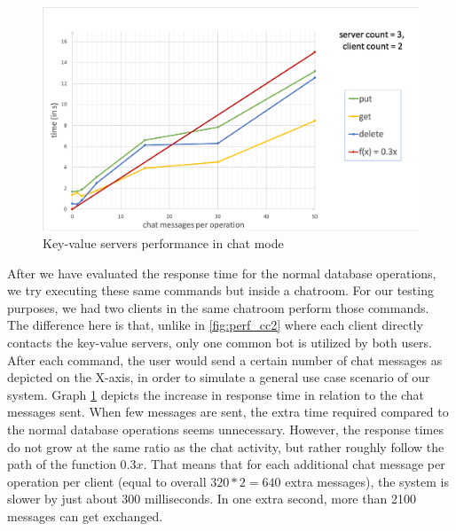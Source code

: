 \begin{figure}[h]
	\centering
	\includegraphics[width=0.8\linewidth]{figures/chat(linear).png}
	\caption{Key-value servers performance in chat mode}
	\label{fig:perf_chat_lin}
\end{figure}

After we have evaluated the response time for the normal database operations, we try executing these same commands but inside a chatroom. For our testing purposes, we had two clients in the same chatroom perform those commands. The difference here is that, unlike in \ref{fig:perf_cc2} where each client directly contacts the key-value servers, only one common bot is utilized by both users. After each command, the user would send a certain number of chat messages as depicted on the X-axis, in order to simulate a general use case scenario of our system. Graph \ref{fig:perf_chat_lin} depicts the increase in response time in relation to the chat messages sent.
When few messages are sent, the extra time required compared to the normal database operations seems unnecessary. 
However, the response times do not grow at the same ratio as the chat activity, but rather roughly follow the path of the function \begin{math}0.3x\end{math}. That means that for each additional chat message per operation per client (equal to overall \begin{math}320 * 2 = 640\end{math} extra messages), the system is slower by just about 300 milliseconds. In one extra second, more than 2100 messages can get exchanged. %